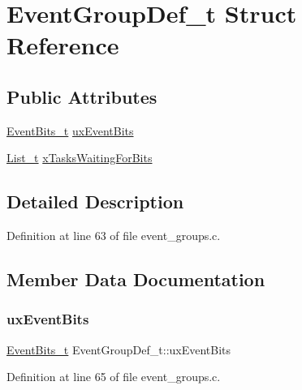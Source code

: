 \hypertarget{structEventGroupDef__t}{}\section{Event\+Group\+Def\+\_\+t Struct Reference}
\label{structEventGroupDef__t}
\subsection*{Public Attributes}
\begin{DoxyCompactItemize}
\item 
\hyperlink{event__groups_8h_ab2f21b93db0b2a0ab64d7a81ff32ac2e}{Event\+Bits\+\_\+t} \hyperlink{structEventGroupDef__t_ab1bcd95a3330b71c55198b2352926643}{ux\+Event\+Bits}
\item 
\hyperlink{list_8h_afd590ef6400071b4d63d65ef90bea7f4}{List\+\_\+t} \hyperlink{structEventGroupDef__t_a3dd347560456bfe452415efb52760dc3}{x\+Tasks\+Waiting\+For\+Bits}
\end{DoxyCompactItemize}


\subsection{Detailed Description}


Definition at line 63 of file event\+\_\+groups.\+c.



\subsection{Member Data Documentation}
\mbox{\label{structEventGroupDef__t_ab1bcd95a3330b71c55198b2352926643}} 
\subsubsection{\texorpdfstring{ux\+Event\+Bits}{uxEventBits}}
{\footnotesize\ttfamily \hyperlink{event__groups_8h_ab2f21b93db0b2a0ab64d7a81ff32ac2e}{Event\+Bits\+\_\+t} Event\+Group\+Def\+\_\+t\+::ux\+Event\+Bits}



Definition at line 65 of file event\+\_\+groups.\+c.

\mbox{\label{structEventGroupDef__t_a3dd347560456bfe452415efb52760dc3}} 
